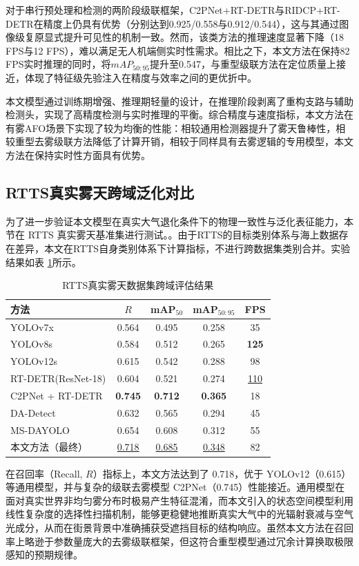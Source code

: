 对于串行预处理和检测的两阶段级联框架，C2PNet+RT-DETR与RIDCP+RT-DETR在精度上仍具有优势（分别达到0.925/0.558与0.912/0.544），这与其通过图像级复原显式提升可见性的机制一致。然而，该类方法的推理速度显著下降（18 FPS与12 FPS），难以满足无人机端侧实时性需求。相比之下，本文方法在保持82 FPS实时推理的同时，将$mAP_{50:95}$提升至0.547，与重型级联方法在定位质量上接近，体现了特征级先验注入在精度与效率之间的更优折中。

本文模型通过训练期增强、推理期轻量的设计，在推理阶段剥离了重构支路与辅助检测头，实现了高精度检测与实时推理的平衡。综合精度与速度指标，本文方法在有雾AFO场景下实现了较为均衡的性能：相较通用检测器提升了雾天鲁棒性，相较重型去雾级联方法降低了计算开销，相较于同样具有去雾逻辑的专用模型，本文方法在保持实时性方面具有优势。

\subsection{RTTS真实雾天跨域泛化对比}
\label{subsec:rtts_cmp}

为了进一步验证本文模型在真实大气退化条件下的物理一致性与泛化表征能力，本节在 RTTS 真实雾天基准集进行测试。。由于RTTS的目标类别体系与海上数据存在差异，本文在RTTS自身类别体系下计算指标，不进行跨数据集类别合并。实验结果如表 \ref{tab:rtts_cmp}所示。

\begin{table}[!htbp]
\centering
\caption{RTTS真实雾天数据集跨域评估结果}
\label{tab:rtts_cmp}
\begin{tabular}{l c c c c}
\hline
方法 & $R$ & mAP$_{50}$ & mAP$_{50:95}$ & FPS \\
\hline
YOLOv7x & 0.564 & 0.495 & 0.258 & 35 \\
YOLOv8s & 0.584 & 0.512 & 0.265 & \textbf{125} \\
YOLOv12s & 0.615 & 0.542 & 0.288 & 98 \\
RT-DETR(ResNet-18) & 0.604 & 0.521 & 0.274 & \underline{110} \\
C2PNet + RT-DETR & \textbf{0.745} & \textbf{0.712} & \textbf{0.365} & 18 \\
DA-Detect & 0.632 & 0.565 & 0.294 & 45 \\
MS-DAYOLO & 0.654 & 0.608 & 0.312 & 55 \\
本文方法（最终） & \underline{0.718} & \underline{0.685} & \underline{0.348} & 82 \\
\hline
\end{tabular}
\end{table}

在召回率（Recall, $R$）指标上，本文方法达到了 0.718，优于 YOLOv12（0.615）等通用模型，并与复杂的级联去雾模型 C2PNet（0.745）性能接近。通用模型在面对真实世界非均匀雾分布时极易产生特征混淆，而本文引入的状态空间模型利用线性复杂度的选择性扫描机制，能够更稳健地推断真实大气中的光辐射衰减与空气光成分，从而在街景背景中准确捕获受遮挡目标的结构响应。虽然本文方法在召回率上略逊于参数量庞大的去雾级联框架，但这符合重型模型通过冗余计算换取极限感知的预期规律。


